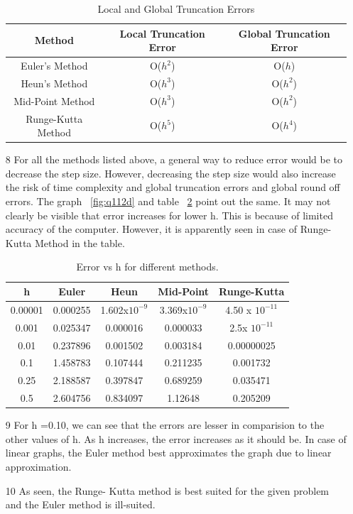 \documentclass[titlepage, 11pt]{article}
\begin{document}
\begin{itemize}
    \begin{table}[]
        \centering
        \begin{tabular}{c|c|c}
             \textbf{Method}& \textbf{Local Truncation Error} & \textbf{Global Truncation Error} \\
             \hline
             Euler's Method & O($h^2$)&O($h$) \\
             Heun's Method & O($h^3$)&O($h^2$)\\
             Mid-Point Method &O($h^3$) &O($h^2$)\\
             Runge-Kutta Method & O($h^5$) &O($h^4$)\\
        \end{tabular}
        \caption{Local and Global Truncation Errors}
        \label{tab:t1}
    \end{table}
    \item [8] For all the methods listed above, a general way to reduce error would be to decrease the step size. However, decreasing the step size would also increase the risk of time complexity and global truncation errors and global round off errors. The graph ~\ref{fig:q112d} and table ~\ref{tab:tab2} point out the same. It may not clearly be visible that error increases for lower h. This is because of limited accuracy of the computer. However, it is apparently seen in case of Runge-Kutta Method in the table.
    \begin{table}[]
        \centering
        \begin{tabular}{c|c|c|c|c}
            \textbf{h} & \textbf{Euler} & \textbf{Heun} &	\textbf{Mid-Point} &	\textbf{Runge-Kutta}\\
            \hline
0.00001	& 0.000255	&1.602x$10^{-9}$	&3.369x$10^{-9}$ &	4.50 x $10^{-11}$ \\
0.001&	0.025347 &	0.000016 &	0.000033 & 2.5x $10^{-11}$\\
0.01 &	0.237896 &	0.001502 &	0.003184 &	0.00000025 \\
0.1 &	1.458783 &	0.107444 &	0.211235 &	0.001732 \\
0.25 &	2.188587 &	0.397847 &	0.689259 &	0.035471 \\
0.5	& 2.604756	&0.834097 &	1.12648 &	0.205209 \\

        \end{tabular}
        \caption{Error vs h for different methods.}
        \label{tab:tab2}
    \end{table}
    \item [9] For h =0.10, we can see that the errors are lesser in comparision to the other values of h. As h increases, the error increases as it should be. In case of linear graphs, the Euler method best approximates the graph due to linear approximation.
    \item [10] As seen, the Runge- Kutta method is best suited for the given problem and the Euler method is ill-suited. 
\end{itemize}
\end{document}
